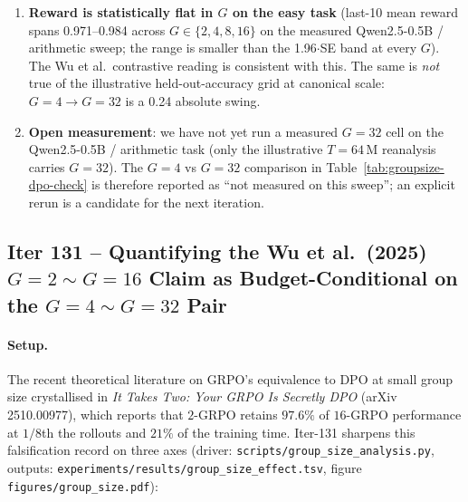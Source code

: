 \begin{enumerate}
  \item \textbf{Reward is statistically flat in $G$ on the easy task}
        (last-10 mean reward spans 0.971--0.984 across
        $G \in \{2, 4, 8, 16\}$ on the measured Qwen2.5-0.5B /
        arithmetic sweep; the range is smaller than the 1.96$\cdot$SE
        band at every $G$). The Wu et al.\ contrastive reading is
        consistent with this. The same is \emph{not} true of
        the illustrative held-out-accuracy grid at canonical scale:
        $G{=}4 \to G{=}32$ is a 0.24 absolute swing.
  \item \textbf{Open measurement}: we have not yet run a measured
        $G{=}32$ cell on the Qwen2.5-0.5B / arithmetic task (only the
        illustrative $T{=}64\,$M reanalysis carries $G{=}32$). The
        $G{=}4$ vs $G{=}32$ comparison in
        Table~\ref{tab:groupsize-dpo-check} is therefore reported as
        ``not measured on this sweep''; an explicit rerun is a
        candidate for the next iteration.
\end{enumerate}

\subsection{Iter 131 -- Quantifying the Wu et al.\ (2025) $G{=}2{\sim}G{=}16$
Claim as Budget-Conditional on the $G{=}4{\sim}G{=}32$ Pair}

\paragraph{Setup.}
The recent theoretical literature on GRPO's equivalence to DPO at
small group size crystallised in \emph{It Takes Two: Your GRPO Is
Secretly DPO} (arXiv 2510.00977), which reports that $2$-GRPO
retains $97.6\%$ of $16$-GRPO performance at $1/8$th the rollouts
and $21\%$ of the training time. Iter-131 sharpens this falsification
record on three axes (driver: \texttt{scripts/group\_size\_analysis.py},
outputs: \texttt{experiments/results/group\_size\_effect.tsv},
figure \texttt{figures/group\_size.pdf}):

